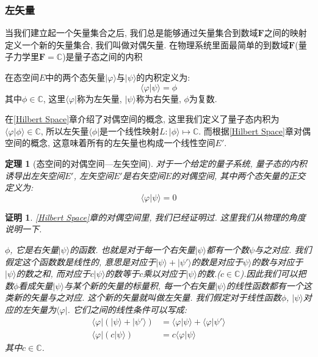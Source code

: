 \documentclass[a4paper,11pt]{article}
\theoremstyle{mystyle}
\newtheorem{theorem}{\hspace{2em}定理}[section]
\newtheorem{Proof}{\hspace{2em}证明}[section]
\begin{document}
\subsubsection{左矢量}
当我们建立起一个矢量集合之后, 我们总是能够通过矢量集合到数域$\mathbf{F}$之间的映射定义一个新的矢量集合, 我们叫做对偶矢量. 在物理系统里面最简单的到数域$\mathbf{F}$(量子力学里$\mathbf{F}=\mathbb{C}$)是量子态之间的内积
\begin{definition}[量子态的内积]
  在态空间$E$中的两个态矢量$|\varphi\rangle$与$|\psi\rangle$的内积定义为:
\begin{equation*}
  \langle\varphi|\psi\rangle=\phi
\end{equation*}
其中$\phi\in\mathbb{C}$, 这里$\langle\varphi|$称为左矢量, $|\psi\rangle$称为右矢量, $\phi$为复数.
\end{definition}
在\ref{Hilbert Space}章介绍了对偶空间的概念, 这里我们定义了量子态内积为$\langle\varphi|\phi\rangle\in\mathbb{C}$, 所以左矢量$\langle\phi|$是一个线性映射$L:|\phi\rangle\longmapsto\mathbb{C}$. 而根据\ref{Hilbert Space}章对偶空间的概念, 这意味着所有的左矢量也构成一个线性空间$E'$.
\begin{theorem}[态空间的对偶空间---左矢空间]
  对于一个给定的量子系统, 量子态的内积诱导出左矢空间$E'$, 左矢空间$E'$是右矢空间$E$的对偶空间, 其中两个态矢量的正交定义为:
\begin{equation*}
  \langle\varphi|\psi\rangle=0
\end{equation*}
\end{theorem}
\begin{Proof}
\ref{Hilbert Space}章的对偶空间里, 我们已经证明过. 这里我们从物理的角度说明一下.

$\phi$, 它是右矢量$|\psi\rangle$的函数. 也就是对于每一个右矢量$|\psi\rangle$都有一个数$\psi$与之对应. 我们假定这个函数数是线性的, 意思是对应于$|\psi\rangle+|\psi'\rangle$的数是对应于$\psi\rangle$的数与对应于$|\psi\rangle$的数之和, 而对应于$c|\psi\rangle$的数等于$c$乘以对应于$|\psi\rangle$的数.($c\in\mathbb{C}$).因此我们可以把数$\phi$看成矢量$|\psi\rangle$与某个新的矢量的标量积, 每一个右矢量$|\psi\rangle$的线性函数都有一个这类新的矢量与之对应. 这个新的矢量就叫做左矢量. 我们假定对于线性函数$\phi$, $|\psi\rangle$对应的左矢量为$\langle\varphi|$. 它们之间的线性条件可以写成:
\begin{equation}\label{leftvec add 1}
  \begin{split}
     \langle\varphi|(|\psi\rangle+|\psi'\rangle)&=\langle\varphi|\psi\rangle+\langle\varphi|\psi'\rangle \\
     \langle\varphi|(c|\psi\rangle)&=c\langle\varphi|\psi\rangle
  \end{split}
\end{equation}
其中$c\in\mathbb{C}$.
\end{Proof}
\end{document}
